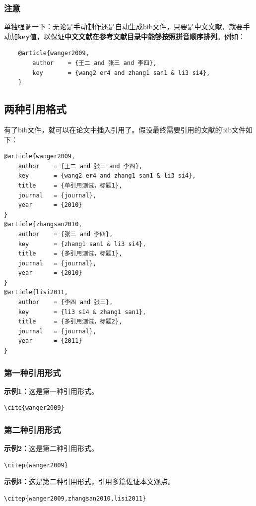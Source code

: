 \subsubsection{注意}
单独强调一下：无论是手动制作还是自动生成bib文件，只要是中文文献，就要手动加\textbf{key}值，以保证\textbf{中文文献在参考文献目录中能够按照拼音顺序排列}。例如：
\begin{lstlisting}
	@article{wanger2009,
		author    = {王二 and 张三 and 李四},
		key       = {wang2 er4 and zhang1 san1 & li3 si4},
	}
\end{lstlisting}
\subsection{两种引用格式}
有了bib文件，就可以在论文中插入引用了。假设最终需要引用的文献的bib文件如下：
\begin{lstlisting}
@article{wanger2009,
	author    = {王二 and 张三 and 李四},
	key       = {wang2 er4 and zhang1 san1 & li3 si4},
	title     = {单引用测试，标题1},
	journal   = {journal},
	year      = {2010}	
}
@article{zhangsan2010,
	author    = {张三 and 李四},
	key       = {zhang1 san1 & li3 si4},
	title     = {多引用测试，标题1},
	journal   = {journal},
	year      = {2010}	
}
@article{lisi2011,
	author    = {李四 and 张三},
	key       = {li3 si4 & zhang1 san1},
	title     = {多引用测试，标题2},
	journal   = {journal},
	year      = {2011}	
}
\end{lstlisting}
\subsubsection{第一种引用形式}
\textbf{示例1：}\cite{wanger2009}这是第一种引用形式。
\begin{lstlisting}
\cite{wanger2009}
\end{lstlisting}

\subsubsection{第二种引用形式}
\textbf{示例2：}这是第二种引用形式\citep{wanger2009}。
\begin{lstlisting}
\citep{wanger2009}
\end{lstlisting}

\textbf{示例3：}这是第二种引用形式\citep{wanger2009,zhangsan2010,lisi2011}，引用多篇佐证本文观点。
\begin{lstlisting}
\citep{wanger2009,zhangsan2010,lisi2011}
\end{lstlisting}

